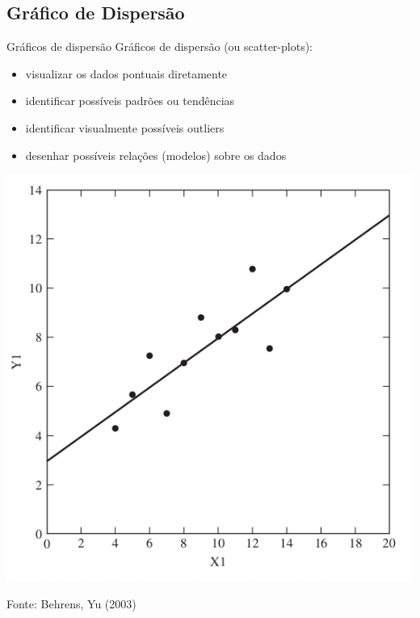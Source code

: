 \documentclass{beamer}
\begin{document}
\subsection{Gráfico de Dispersão}

\begin{frame}{Gráficos de dispersão}
Gráficos de dispersão (ou scatter-plots):
  \begin{itemize}
  \item visualizar os dados pontuais diretamente
  \item identificar possíveis padrões ou tendências
  \item identificar visualmente possíveis outliers
  \item desenhar possíveis relações (modelos) sobre os dados
  \end{itemize}
\end{frame}

\begin{frame}
  \begin{center}
    \includegraphics[height=0.7\textheight]{EDA/eda-dispersao1}
  \end{center}
  Fonte: Behrens, Yu (2003)
\end{frame}
\end{document}
